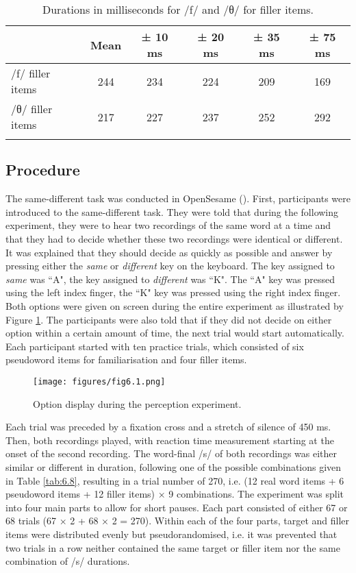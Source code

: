 \begin{table}\fontsize{10}{11}
\caption{Durations in milliseconds for /f/ and /θ/ for filler items.}
\label{tab:6.7}
\centering
\begin{tabular}{lccccc} 
\lsptoprule
~             & Mean & ± 10 ms & ± 20 ms & ± 35 ms & ± 75 ms  \\ 
\midrule
/f/ filler items & 244  & 234     & 224     & 209     & 169      \\
/θ/ filler items & 217  & 227     & 237     & 252     & 292      \\
\lspbottomrule
\end{tabular}
\end{table}

\subsection{Procedure}\label{section06_1_3}

The same-different task was conducted in OpenSesame (\cite{Mathot2012}). First, participants were introduced to the same-different task. They were told that during the following experiment, they were to hear two recordings of the same word at a time and that they had to decide whether these two recordings were identical or different. It was explained that they should decide as quickly as possible and answer by pressing either the \textit{same} or \textit{different} key on the keyboard. The key assigned to \textit{same} was ``A", the key assigned to \textit{different} was ``K". The ``A" key was pressed using the left index finger, the ``K" key was pressed using the right index finger. Both options were given on screen during the entire experiment as illustrated by Figure \ref{fig:6_1}. The participants were also told that if they did not decide on either option within a certain amount of time, the next trial would start automatically. Each participant started with ten practice trials, which consisted of six pseudoword items for familiarisation and four filler items.

\begin{figure}
    \centering
    \texttt{[image: figures/fig6.1.png]}
    \caption{Option display during the perception experiment.}
    \label{fig:6_1}
\end{figure}

Each trial was preceded by a fixation cross and a stretch of silence of 450 ms. Then, both recordings played, with reaction time measurement starting at the onset of the second recording. The word-final /s/ of both recordings was either similar or different in duration, following one of the possible combinations given in Table \ref{tab:6.8}, resulting in a trial number of 270, i.e. (12 real word items + 6 pseudoword items + 12 filler items) × 9 combinations. The experiment was split into four main parts to allow for short pauses. Each part consisted of either 67 or 68 trials 
(67 × 2 + 68 × 2 = 270). Within each of the four parts, target and filler items were distributed evenly but pseudorandomised, i.e. it was prevented that two trials in a row neither contained the same target or filler item nor the same combination of /s/ durations.


